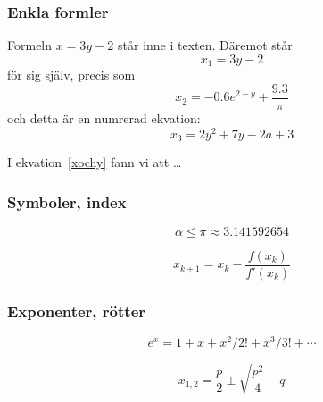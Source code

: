 \begin{frame}[fragile,t]
  \frametitle{Enkla formler}
  \vspace{2em}

  \begin{exlatex}
Formeln \(x=3y-2\) står inne i texten. Däremot står
\begin{displaymath}
  x_1 = 3y - 2
\end{displaymath}
för sig själv, precis som
\[x_2 = -0.6e^{2-y} + \frac{9.3}{\pi}\]
och detta är en numrerad ekvation:
\begin{equation}
  x_3 = 2y^2 + 7y - 2a + 3
  \label{xochy}
\end{equation}

I ekvation~\ref{xochy} fann
vi att \ldots
  \end{exlatex}
\end{frame}

\begin{frame}[fragile,t]
  \frametitle{Symboler, index}
  \vspace{2em}

  \begin{exlatex}
\begin{displaymath}
  \alpha \leq \pi \approx 3.141592654
\end{displaymath}
  \end{exlatex}

  \vspace{1cm}

  \begin{exlatex}
\[
  x_{k+1} =
  x_{k} -
  \frac{f(x_{k})}{f'(x_{k})}
\]
  \end{exlatex}
\end{frame}

\begin{frame}[fragile,t]
  \frametitle{Exponenter, rötter}
  \vspace{2em}

  \begin{exlatex}
\[
  e^x = 1+x+x^2/2!+x^3/3!+\cdots
\]
  \end{exlatex}

  \vspace{1cm}

  \begin{exlatex}
\[
  x_{1,2}=\frac{p}{2}\pm
  \sqrt{\frac{p^2}{4}-q}
\]
  \end{exlatex}

\end{frame}



